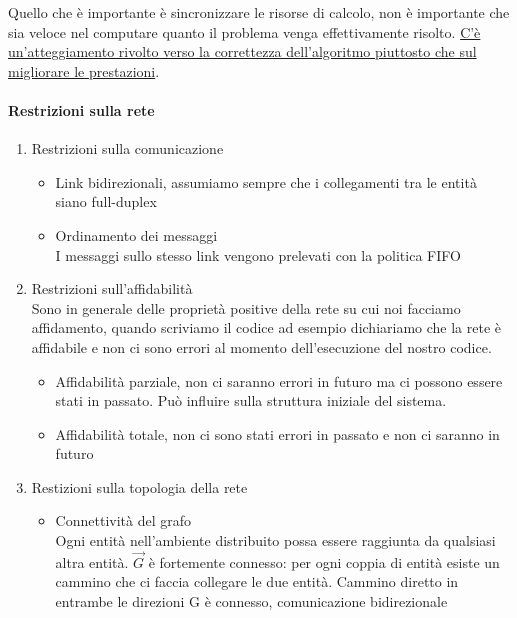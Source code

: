 Quello che è importante è sincronizzare le risorse di calcolo, non è importante che sia veloce nel computare quanto il problema venga effettivamente risolto. \uline{C'è un'atteggiamento rivolto verso la correttezza dell'algoritmo piuttosto che sul migliorare le prestazioni}. 

\paragraph{Restrizioni sulla rete}
\begin{enumerate}
    \item Restrizioni sulla comunicazione
    \begin{itemize}
        \item Link bidirezionali, assumiamo sempre che i collegamenti tra le entità siano full-duplex
        \item Ordinamento dei messaggi\\
        I messaggi sullo stesso link vengono prelevati con la politica FIFO
    \end{itemize}
    \item Restrizioni sull'affidabilità\\
    Sono in generale delle proprietà positive della rete su cui noi facciamo affidamento, quando scriviamo il codice ad esempio dichiariamo che la rete è affidabile e non ci sono errori al momento dell'esecuzione del nostro codice. 
    \begin{itemize}
        \item Affidabilità parziale, non ci saranno errori in futuro ma ci possono essere stati in passato. Può influire sulla struttura iniziale del sistema.
        \item Affidabilità totale, non ci sono stati errori in passato e non ci saranno in futuro
    \end{itemize}
    \item Restizioni sulla topologia della rete
    \begin{itemize}
        \item Connettività del grafo\\
        Ogni entità nell'ambiente distribuito possa essere raggiunta da qualsiasi altra entità. $\vec{G}$ è fortemente connesso: per ogni coppia di entità esiste un cammino che ci faccia collegare le due entità. Cammino diretto in entrambe le direzioni                                                                                                                                                                                                                                                                                                                                                                    G è connesso, comunicazione bidirezionale
    \end{itemize}
\end{enumerate}


